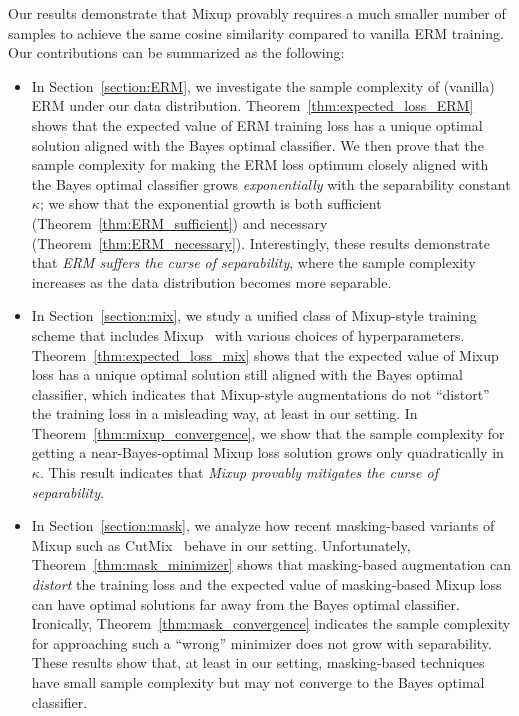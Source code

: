 Our results demonstrate that Mixup provably requires a much smaller number of samples to achieve the same cosine similarity compared to vanilla ERM training. Our contributions can be summarized as the following:
\begin{itemize}

    \item In Section~\ref{section:ERM}, we investigate the sample complexity of (vanilla) ERM under our data distribution. 
    Theorem~\ref{thm:expected_loss_ERM} shows that the expected value of ERM training loss has a unique optimal solution aligned with the Bayes optimal classifier. 
    We then prove that the sample complexity for making the ERM loss optimum closely aligned with the Bayes optimal classifier grows \emph{exponentially} with the separability constant $\kappa$; we show that the exponential growth is both sufficient (Theorem~\ref{thm:ERM_sufficient}) and necessary (Theorem~\ref{thm:ERM_necessary}). Interestingly, these results demonstrate that \emph{ERM suffers the curse of separability}, where the sample complexity increases as the data distribution becomes more separable.
    
    \item In Section~\ref{section:mix}, we study a unified class of Mixup-style training scheme that includes Mixup~\citep{zhang2018mixup} with various choices of hyperparameters. Theorem~\ref{thm:expected_loss_mix} shows that the expected value of Mixup loss has a unique optimal solution still aligned with the Bayes optimal classifier, which indicates that Mixup-style augmentations do not ``distort'' the training loss in a misleading way, at least in our setting. 
    In Theorem~\ref{thm:mixup_convergence}, we show that the sample complexity for getting a near-Bayes-optimal Mixup loss solution grows only quadratically in $\kappa$. This result indicates that \emph{Mixup provably mitigates the curse of separability}.
    
    \item  In Section~\ref{section:mask}, we analyze how recent masking-based variants of Mixup such as CutMix~\citep{yun2019cutmix} behave in our setting. Unfortunately, Theorem~\ref{thm:mask_minimizer} shows that masking-based augmentation can \emph{distort} the training loss and the expected value of masking-based Mixup loss can have optimal solutions far away from the Bayes optimal classifier. Ironically, Theorem~\ref{thm:mask_convergence} indicates the sample complexity for approaching such a ``wrong'' minimizer does not grow with separability. These results show that, at least in our setting, masking-based techniques have small sample complexity but may not converge to the Bayes optimal classifier.
\end{itemize}